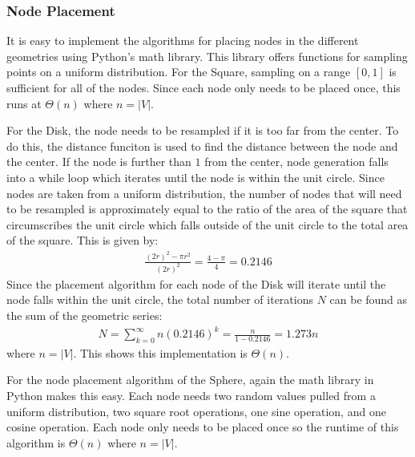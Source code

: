 \documentclass{article}
\begin{document}
        \subsubsection{Node Placement}
        It is easy to implement the algorithms for placing nodes in the different geometries using Python's math library. This library offers functions for sampling points on a uniform distribution. For the Square, sampling on a range $[0,1]$ is sufficient for all of the nodes. Since each node only needs to be placed once, this runs at $\Theta(n)$ where $n = |V|$.
        \par
        For the Disk, the node needs to be resampled if it is too far from the center. To do this, the distance funciton is used to find the distance between the node and the center. If the node is further than $1$ from the center, node generation falls into a while loop which iterates until the node is within the unit circle. Since nodes are taken from a uniform distribution, the number of nodes that will need to be resampled is approximately equal to the ratio of the area of the square that circumscribes the unit circle which falls outside of the unit circle to the total area of the square. This is given by:
        \begin{align}
            \frac{(2r)^2-\pi r^2}{(2r)^2} = \frac{4-\pi}{4} = 0.2146
        \end{align}
        Since the placement algorithm for each node of the Disk will iterate until the node falls within the unit circle, the total number of iterations $N$ can be found as the sum of the geometric series:
        \begin{align}
            N = \sum_{k=0}^{\infty} n (0.2146)^k = \frac{n}{1-0.2146} = 1.273n
        \end{align}
        where $n = |V|$. This shows this implementation is $\Theta\left(n\right)$.
        \par
        For the node placement algorithm of the Sphere, again the math library in Python makes this easy. Each node needs two random values pulled from a uniform distribution, two square root operations, one sine operation, and one cosine operation. Each node only needs to be placed once so the runtime of this algorithm is $\Theta(n)$ where $n = |V|$.
\end{document}
